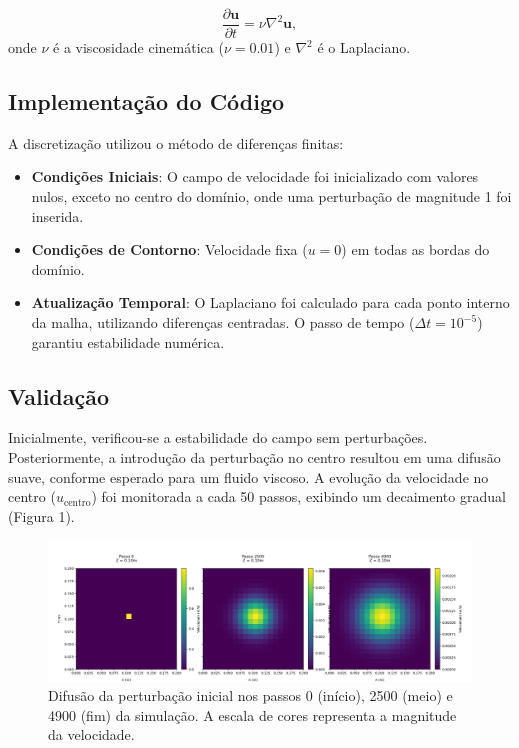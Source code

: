 \documentclass[a4paper, 12pt]{article}
\begin{document}
	\[  
	\frac{\partial \mathbf{u}}{\partial t} = \nu \nabla^2 \mathbf{u},  
	\]  
	onde \( \nu \) é a viscosidade cinemática (\( \nu = 0.01 \)) e \( \nabla^2 \) é o Laplaciano.  
	
	\subsection{Implementação do Código}  
	A discretização utilizou o método de diferenças finitas:  
	\begin{itemize}  
		\item \textbf{Condições Iniciais}: O campo de velocidade foi inicializado com valores nulos, exceto no centro do domínio, onde uma perturbação de magnitude 1 foi inserida.  
		\item \textbf{Condições de Contorno}: Velocidade fixa (\( u = 0 \)) em todas as bordas do domínio.  
		\item \textbf{Atualização Temporal}: O Laplaciano foi calculado para cada ponto interno da malha, utilizando diferenças centradas. O passo de tempo (\( \Delta t = 10^{-5} \)) garantiu estabilidade numérica.  
	\end{itemize}  
	
	\subsection{Validação}  
	Inicialmente, verificou-se a estabilidade do campo sem perturbações. Posteriormente, a introdução da perturbação no centro resultou em uma difusão suave, conforme esperado para um fluido viscoso. A evolução da velocidade no centro (\( u_{\text{centro}} \)) foi monitorada a cada 50 passos, exibindo um decaimento gradual (Figura 1).  
	
	\begin{figure}[h]
		\centering
		\includegraphics[width=\linewidth]{imgs/Figure_1.png}
		\caption{Difusão da perturbação inicial nos passos 0 (início), 2500 (meio) e 4900 (fim) da simulação. A escala de cores representa a magnitude da velocidade.}
	\end{figure}
	
\end{document}
